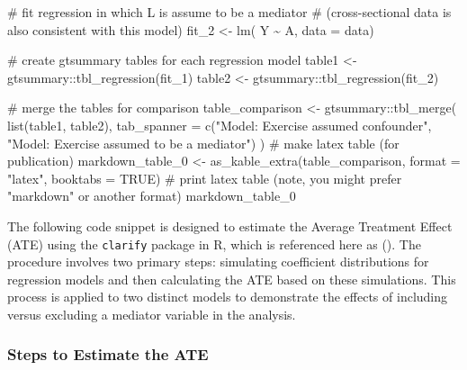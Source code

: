 \documentclass[
  singlecolumn]{article}
\newenvironment{Shaded}{}{}
\newcommand{\AttributeTok}[1]{\textcolor[rgb]{0.84,0.23,0.29}{#1}}
\newcommand{\CommentTok}[1]{\textcolor[rgb]{0.42,0.45,0.49}{#1}}
\newcommand{\ConstantTok}[1]{\textcolor[rgb]{0.00,0.36,0.77}{#1}}
\newcommand{\FunctionTok}[1]{\textcolor[rgb]{0.44,0.26,0.76}{#1}}
\newcommand{\NormalTok}[1]{\textcolor[rgb]{0.14,0.16,0.18}{#1}}
\newcommand{\OtherTok}[1]{\textcolor[rgb]{0.44,0.26,0.76}{#1}}
\newcommand{\SpecialCharTok}[1]{\textcolor[rgb]{0.00,0.36,0.77}{#1}}
\newcommand{\StringTok}[1]{\textcolor[rgb]{0.01,0.18,0.38}{#1}}
\begin{document}
\begin{Shaded}
\begin{Highlighting}[]
\CommentTok{\# fit regression in which L is assume to be a mediator}
\CommentTok{\# (cross{-}sectional data is also consistent with this model)}
\NormalTok{fit\_2 }\OtherTok{\textless{}{-}} \FunctionTok{lm}\NormalTok{( Y }\SpecialCharTok{\textasciitilde{}}\NormalTok{ A, }\AttributeTok{data =}\NormalTok{ data)}

\CommentTok{\# create gtsummary tables for each regression model}
\NormalTok{table1 }\OtherTok{\textless{}{-}}\NormalTok{ gtsummary}\SpecialCharTok{::}\FunctionTok{tbl\_regression}\NormalTok{(fit\_1)}
\NormalTok{table2 }\OtherTok{\textless{}{-}}\NormalTok{ gtsummary}\SpecialCharTok{::}\FunctionTok{tbl\_regression}\NormalTok{(fit\_2)}

\CommentTok{\# merge the tables for comparison}
\NormalTok{table\_comparison }\OtherTok{\textless{}{-}}\NormalTok{ gtsummary}\SpecialCharTok{::}\FunctionTok{tbl\_merge}\NormalTok{(}
  \FunctionTok{list}\NormalTok{(table1, table2),}
  \AttributeTok{tab\_spanner =} \FunctionTok{c}\NormalTok{(}\StringTok{"Model: Exercise assumed confounder"}\NormalTok{, }
                  \StringTok{"Model: Exercise assumed to be a mediator"}\NormalTok{)}
\NormalTok{)}
\CommentTok{\# make latex table (for publication)}
\NormalTok{markdown\_table\_0 }\OtherTok{\textless{}{-}} \FunctionTok{as\_kable\_extra}\NormalTok{(table\_comparison, }
                                   \AttributeTok{format =} \StringTok{"latex"}\NormalTok{, }
                                   \AttributeTok{booktabs =} \ConstantTok{TRUE}\NormalTok{)}
\CommentTok{\# print latex table (note, you might prefer "markdown" or another format)                                }
\NormalTok{markdown\_table\_0}
\end{Highlighting}
\end{Shaded}

The following code snippet is designed to estimate the Average Treatment
Effect (ATE) using the \texttt{clarify} package in R, which is
referenced here as (). The procedure involves two primary steps: simulating coefficient
distributions for regression models and then calculating the ATE based
on these simulations. This process is applied to two distinct models to
demonstrate the effects of including versus excluding a mediator
variable in the analysis.

\subsubsection{Steps to Estimate the
ATE}\label{steps-to-estimate-the-ate}
\end{document}
